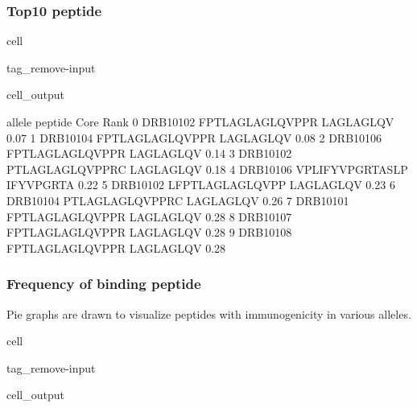 \documentclass[letterpaper,10pt,english]{jupyterBook}
\begin{document}
\subsubsection{Top10 peptide}
\label{\detokenize{ipynb/chapter4:top10-peptide}}
\begin{sphinxuseclass}{cell}
\begin{sphinxuseclass}{tag_remove-input}\begin{sphinxVerbatimOutput}

\begin{sphinxuseclass}{cell_output}
\begin{sphinxVerbatim}[commandchars=\\\{\}]
      allele          peptide       Core  Rank
0  DRB1\PYGZus{}0102  FPTLAGLAGLQVPPR  LAGLAGLQV  0.07
1  DRB1\PYGZus{}0104  FPTLAGLAGLQVPPR  LAGLAGLQV  0.08
2  DRB1\PYGZus{}0106  FPTLAGLAGLQVPPR  LAGLAGLQV  0.14
3  DRB1\PYGZus{}0102  PTLAGLAGLQVPPRC  LAGLAGLQV  0.18
4  DRB1\PYGZus{}0106  VPLIFYVPGRTASLP  IFYVPGRTA  0.22
5  DRB1\PYGZus{}0102  LFPTLAGLAGLQVPP  LAGLAGLQV  0.23
6  DRB1\PYGZus{}0104  PTLAGLAGLQVPPRC  LAGLAGLQV  0.26
7  DRB1\PYGZus{}0101  FPTLAGLAGLQVPPR  LAGLAGLQV  0.28
8  DRB1\PYGZus{}0107  FPTLAGLAGLQVPPR  LAGLAGLQV  0.28
9  DRB1\PYGZus{}0108  FPTLAGLAGLQVPPR  LAGLAGLQV  0.28
\end{sphinxVerbatim}

\end{sphinxuseclass}\end{sphinxVerbatimOutput}

\end{sphinxuseclass}
\end{sphinxuseclass}

\subsubsection{Frequency of binding peptide}
\label{\detokenize{ipynb/chapter4:id2}}
\sphinxAtStartPar
Pie graphs are drawn to visualize peptides with immunogenicity in various alleles.

\begin{sphinxuseclass}{cell}
\begin{sphinxuseclass}{tag_remove-input}\begin{sphinxVerbatimOutput}

\begin{sphinxuseclass}{cell_output}
\noindent{}

\end{sphinxuseclass}\end{sphinxVerbatimOutput}

\end{sphinxuseclass}
\end{sphinxuseclass}
\end{document}
